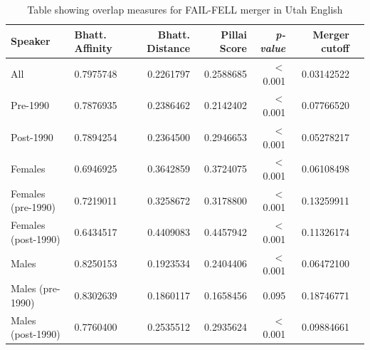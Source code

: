 \documentclass[12pt, letterpaper]{article}
\begin{document}
\begin{table}[ht!]
\centering
\caption{Table showing overlap measures for FAIL-FELL merger in Utah English}
\begin{tabular}{llrrrrr}
  \hline
  Speaker & Bhatt. Affinity & Bhatt. Distance & Pillai Score & \textit{p-value} & Merger cutoff \\ 
  \hline
  All & 0.7975748 & 0.2261797 & 0.2588685 & $<$0.001 & 0.03142522 \\ 
  Pre-1990 & 0.7876935 & 0.2386462 & 0.2142402 & $<$0.001 & 0.07766520 \\ 
  Post-1990 & 0.7894254 & 0.2364500 & 0.2946653 & $<$0.001 & 0.05278217 \\ 
  Females & 0.6946925 & 0.3642859 & 0.3724075 & $<$0.001 & 0.06108498 \\ 
  Females (pre-1990) & 0.7219011 & 0.3258672 & 0.3178800 & $<$0.001 & 0.13259911 \\ 
  Females (post-1990) & 0.6434517 & 0.4409083 & 0.4457942 & $<$0.001 & 0.11326174 \\ 
  Males & 0.8250153 & 0.1923534 & 0.2404406 & $<$0.001 & 0.06472100 \\ 
  Males (pre-1990) & 0.8302639 & 0.1860117 & 0.1658456 & 0.095 & 0.18746771 \\ 
  Males (post-1990) & 0.7760400 & 0.2535512 & 0.2935624 & $<$0.001 & 0.09884661 \\ 
  \hline
\end{tabular}
\end{table}


\printbibliography[heading=bibintoc]
\end{document}

